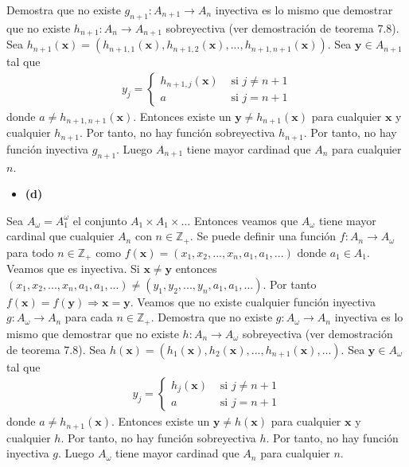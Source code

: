 \documentclass{article}
\newcommand{\vect}[1]{\boldsymbol{#1}}
\begin{document}
Demostra que no existe $g_{n+1}:A_{n+1}\rightarrow A_n$ inyectiva es lo mismo que demostrar que no existe $h_{n+1}:A_{n}\rightarrow A_{n+1}$ sobreyectiva (ver demostración de teorema 7.8). Sea $h_{n+1}(\vect{x})=(h_{n+1,1}(\vect{x}),h_{n+1,2}(\vect{x}),...,h_{n+1,n+1}(\vect{x}))$.  Sea $\vect{y}\in A_{n+1}$ tal que
\begin{eqnarray}
y_j=\begin{cases}
h_{n+1,j}(\vect{x}) & \text{ si }j\neq n+1 \nonumber\\
a & \text{ si }j= n+1 \nonumber
\end{cases}
\end{eqnarray}
donde $a\neq h_{n+1,n+1}(\vect{x})$. Entonces existe un $\vect{y}\neq h_{n+1}(\vect{x})$ para cualquier $\vect{x}$ y cualquier $h_{n+1}$. Por tanto, no hay función sobreyectiva $h_{n+1}$. Por tanto, no hay función inyectiva $g_{n+1}$. Luego $A_{n+1}$ tiene mayor cardinad que $A_n$ para cualquier $n$.
\begin{itemize}
\item \bf (d) \rm
\end{itemize}
Sea $A_{\omega}=A_1^{\omega}$ el conjunto $A_1\times A_1\times \dots$ Entonces veamos que $A_{\omega}$ tiene mayor cardinal que cualquier $A_n$ con $n\in \mathbb{Z}_{+}$. Se puede definir una función $f:A_n\rightarrow A_{\omega}$ para todo $n\in \mathbb{Z}_{+}$ como $f(\vect{x})=(x_1,x_2,...,x_n,a_1,a_1,...)$ donde $a_1\in A_1$. Veamos que es inyectiva. Si $\vect{x}\neq \vect{y}$ entonces $(x_1,x_2,...,x_n,a_1,a_1,...)\neq (y_1,y_2,...,y_n,a_1,a_1,...)$. Por tanto $f(\vect{x})=f(\vect{y})\Rightarrow \vect{x}= \vect{y}$. Veamos que no existe cualquier función inyectiva  $g:A_{\omega}\rightarrow A_n$ para cada $n \in \mathbb{Z}_{+}$.
Demostra que no existe $g:A_{\omega}\rightarrow A_n$ inyectiva es lo mismo que demostrar que no existe $h:A_{n}\rightarrow A_{\omega}$ sobreyectiva (ver demostración de teorema 7.8). Sea $h(\vect{x})=(h_{1}(\vect{x}),h_{2}(\vect{x}),...,h_{n+1}(\vect{x}),...)$.  Sea $\vect{y}\in A_{\omega}$ tal que
\begin{eqnarray}
y_j=\begin{cases}
h_{j}(\vect{x}) & \text{ si }j\neq n+1 \nonumber\\
a & \text{ si }j= n+1 \nonumber
\end{cases}
\end{eqnarray}
donde $a\neq h_{n+1}(\vect{x})$. Entonces existe un $\vect{y}\neq h(\vect{x})$ para cualquier $\vect{x}$ y cualquier $h$. Por tanto, no hay función sobreyectiva $h$. Por tanto, no hay función inyectiva $g$. Luego $A_{\omega}$ tiene mayor cardinad que $A_n$ para cualquier $n$.
\end{document}
